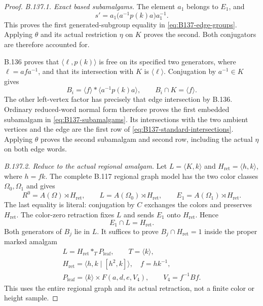 \begin{proof}
\emph{B.137.1. Exact based subamalgams.}
The element $a_1$ belongs to $E_1$, and
\[
 s'=a_1\bigl(a^{-1}p(k)a\bigr)a_1^{-1}.
\]
This proves the first generated-subgroup equality in
\eqref{eq:B137-edge-groups}. Applying $\theta$ and its actual
restriction $\eta$ on $K$ proves the second. Both conjugators
are therefore accounted for.

B.136 proves that $\langle\ell,p(k)\rangle$ is free on its
specified two generators, where $\ell=afa^{-1}$, and that its
intersection with $K$ is $\langle\ell\rangle$.
Conjugation by $a^{-1}\in K$ gives
\[
 B_i=\langle f\rangle*\langle a^{-1}p(k)a\rangle,
 \qquad B_i\cap K=\langle f\rangle.
\]
The other left-vertex factor has precisely that edge
intersection by B.136. Ordinary reduced-word normal form
therefore proves the first embedded subamalgam in
\eqref{eq:B137-subamalgams}. Its intersections with the two
ambient vertices and the edge are the first row of
\eqref{eq:B137-standard-intersections}. Applying $\theta$
proves the second subamalgam and second row, including the
actual $\eta$ on both edge words.

\emph{B.137.2. Reduce to the actual regional amalgam.}
Let $L=\langle K,k\rangle$ and $H_{\mathrm{ret}}=\langle h,k\rangle$,
where $h=fk$. The complete B.117 regional graph model has the
two color classes $\Omega_0,\Omega_1$ and gives
\[
 R^0=A(\Omega)\rtimes H_{\mathrm{ret}},\qquad
 L=A(\Omega_0)\rtimes H_{\mathrm{ret}},\qquad
 E_1=A(\Omega_1)\rtimes H_{\mathrm{ret}}.
\]
The last equality is literal: conjugation by $C$ exchanges the
colors and preserves $H_{\mathrm{ret}}$.
The color-zero retraction fixes $L$ and sends $E_1$ onto
$H_{\mathrm{ret}}$. Hence
\begin{equation}\label{eq:B137-color-intersection}
 E_1\cap L=H_{\mathrm{ret}}.
\end{equation}
Both generators of $B_j$ lie in $L$. It suffices to prove
$B_j\cap H_{\mathrm{ret}}=1$ inside the proper marked amalgam
\begin{equation}\label{eq:B137-regional-tree}
 \begin{gathered}
 L=H_{\mathrm{ret}}*_{T}P_{\mathrm{leaf}},\qquad T=\langle k\rangle,\\
 H_{\mathrm{ret}}=\langle h,k\mid[h^2,k]\rangle,\quad f=hk^{-1},\\
 P_{\mathrm{leaf}}=\langle k\rangle\times F(a,d,e,V_4),
 \qquad V_4=f^{-1}Bf.
 \end{gathered}
\end{equation}
This uses the entire regional graph and its actual retraction,
not a finite color or height sample.


\end{proof}
